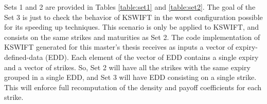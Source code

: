 \documentclass[12,twoside]{mammeTFM}
\theoremstyle{definition}
\theoremstyle{remark}
\begin{document}
Sets 1 and 2 are provided in Tables \ref{table:set1} and \ref{table:set2}. The goal of the Set 3 is just to check the behavior of KSWIFT in the worst configuration possible for its speeding up techniques. This scenario is only be applied to KSWIFT, and consists on the same strikes and maturities as Set 2. The code implementation of KSWIFT generated for this master's thesis receives as inputs a vector of expiry-defined-data (EDD). Each element of the vector of EDD contains a single expiry and a vector of strikes. So, Set 2 will have all the strikes with the same expiry grouped in a single EDD, and Set 3 will have EDD consisting on a single strike. This will enforce full recomputation of the density and payoff coefficients for each strike.
\end{document}
